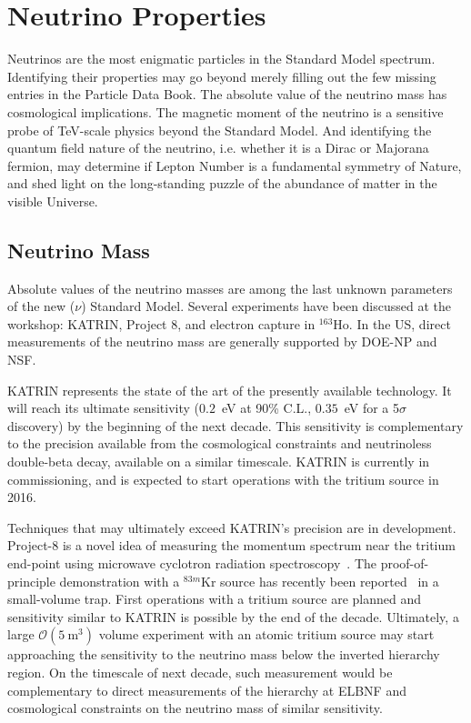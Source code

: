 \section{Neutrino Properties}
\label{sec:Properties}

Neutrinos are the most enigmatic particles in the Standard Model
spectrum. Identifying their properties may go beyond merely filling
out the few missing entries in the Particle Data Book. The absolute
value of the neutrino mass has cosmological implications. The magnetic
moment of the neutrino is a sensitive probe of TeV-scale physics
beyond the Standard Model. And identifying the quantum field nature of
the neutrino, i.e. whether it is a Dirac or Majorana fermion, may
determine if Lepton Number is a fundamental symmetry of Nature, and
shed light on the long-standing puzzle of the abundance of matter
in the visible Universe.

\subsection{Neutrino Mass}

Absolute values of the neutrino masses are among the last unknown
parameters of the new ($\nu$) Standard Model. Several experiments
have been discussed at the workshop: KATRIN, Project 8, and electron
capture in $^{163}$Ho. In the US, direct measurements of the neutrino
mass are generally supported by DOE-NP and NSF.


KATRIN represents the state of the art of the presently available
technology. It will reach its ultimate sensitivity ($0.2$~eV at 90\%
C.L., $0.35$~eV for a 5$\sigma$ discovery) by the beginning of the
next decade. This sensitivity is complementary to the precision
available from the cosmological constraints and neutrinoless
double-beta decay, available on a similar timescale. KATRIN is
currently in commissioning, and is expected to start operations with
the tritium source in 2016.

Techniques that may ultimately exceed KATRIN's precision are in
development. Project-8 is a novel idea of measuring the momentum
spectrum near the tritium end-point using microwave cyclotron
radiation spectroscopy~\cite{Monreal:2009za}. The proof-of-principle
demonstration with a $^{83m}$Kr source has recently been
reported~\cite{Asner:2014cwa} in a small-volume trap. First operations
with a tritium source are planned and sensitivity similar to KATRIN is
possible by the end of the decade. Ultimately, a large
$\mathcal{O}(5~\mathrm{m}^3)$ volume experiment with an atomic tritium
source may start approaching the sensitivity to the neutrino mass
below the inverted hierarchy region. On the timescale of next decade,
such measurement would be complementary to direct measurements of the
hierarchy at ELBNF and cosmological constraints on the neutrino mass
of similar sensitivity.


